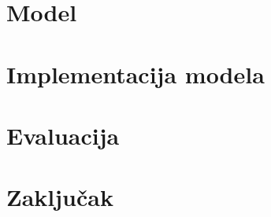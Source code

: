 \documentclass[times, utf8, seminar]{fer}
\begin{document}
\chapter{Model}

\chapter{Implementacija modela}

\chapter{Evaluacija}

\chapter{Zaključak}



\nocite{*}

\begin{sazetak}


\kljucnerijeci{}
\end{sazetak}
\begin{abstract}


\keywords{}
\end{abstract}
\end{document}
